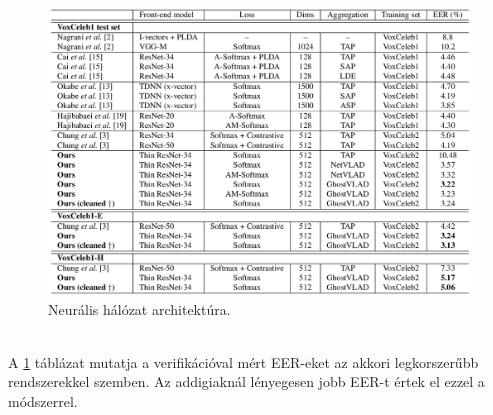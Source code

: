 \begin{figure}[!ht]
	\centering
	\includegraphics[width=150mm, keepaspectratio]{figures/frame-cnn-results.png}
	\caption{Neurális hálózat architektúra.}
	\label{fig:frame-cnn-results}
\end{figure}
\ \\
A \ref{fig:frame-cnn-results} táblázat mutatja a verifikációval mért EER-eket az akkori legkorszerűbb rendszerekkel szemben. Az addigiaknál lényegesen jobb EER-t értek el ezzel a módszerrel.


